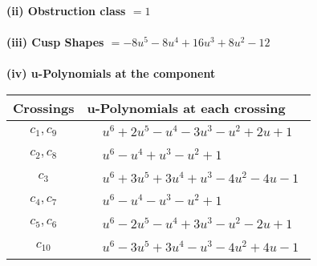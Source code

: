 \documentclass[1p]{elsarticle_modified}
\theoremstyle{definition}
\begin{document}
\flushleft \textbf{(ii) Obstruction class $= 1$}\\~\\
\flushleft \textbf{(iii) Cusp Shapes $= -8 u^5-8 u^4+16 u^3+8 u^2-12$}\\~\\
\newpage\renewcommand{\arraystretch}{1}
\flushleft \textbf{(iv) u-Polynomials at the component}\newline \\
\begin{tabular}{m{50pt}|m{274pt}}
Crossings & \hspace{64pt}u-Polynomials at each crossing \\
\hline $$\begin{aligned}c_{1},c_{9}\end{aligned}$$&$\begin{aligned}
&u^6+2 u^5- u^4-3 u^3- u^2+2 u+1
\end{aligned}$\\
\hline $$\begin{aligned}c_{2},c_{8}\end{aligned}$$&$\begin{aligned}
&u^6- u^4+u^3- u^2+1
\end{aligned}$\\
\hline $$\begin{aligned}c_{3}\end{aligned}$$&$\begin{aligned}
&u^6+3 u^5+3 u^4+u^3-4 u^2-4 u-1
\end{aligned}$\\
\hline $$\begin{aligned}c_{4},c_{7}\end{aligned}$$&$\begin{aligned}
&u^6- u^4- u^3- u^2+1
\end{aligned}$\\
\hline $$\begin{aligned}c_{5},c_{6}\end{aligned}$$&$\begin{aligned}
&u^6-2 u^5- u^4+3 u^3- u^2-2 u+1
\end{aligned}$\\
\hline $$\begin{aligned}c_{10}\end{aligned}$$&$\begin{aligned}
&u^6-3 u^5+3 u^4- u^3-4 u^2+4 u-1
\end{aligned}$\\
\hline
\end{tabular}\\~\\
\end{document}
